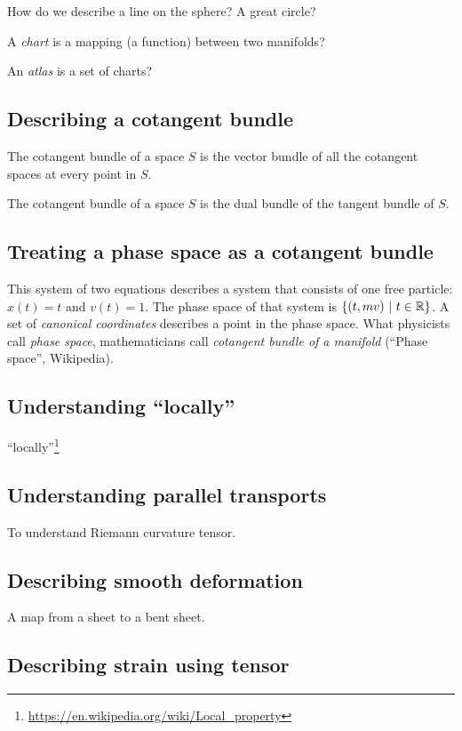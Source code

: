 How do we describe a line on the sphere?
A great circle?

A \emph{chart} is a mapping (a function) between two manifolds?

An \emph{atlas} is a set of charts?

\subsection{Describing a cotangent bundle}

The cotangent bundle of a space \(S\) is the vector bundle of all the cotangent spaces at every point in \(S\).

The cotangent bundle of a space \(S\) is the dual bundle of the tangent bundle of \(S\).

\subsection{Treating a phase space as a cotangent bundle}

This system of two equations describes a system that consists of one free particle: \( x(t) = t \) and \( v(t) = 1 \).
The phase space of that system is \( \{ (t,mv) ~|~ t \in \mathbb{R} \} \).
A set of \emph{canonical coordinates} describes a point in the phase space.
What physicists call \emph{phase space},
mathematicians call \emph{cotangent bundle of a manifold} (\enquote{Phase space}, Wikipedia).

\subsection{Understanding \enquote{locally}}

\enquote{locally}\footnote{\url{https://en.wikipedia.org/wiki/Local_property}}

\subsection{Understanding parallel transports}

To understand Riemann curvature tensor.
\cite{arnold1989mathematical}

\subsection{Describing smooth deformation}

A map from a sheet to a bent sheet.

\subsection{Describing strain using tensor}

